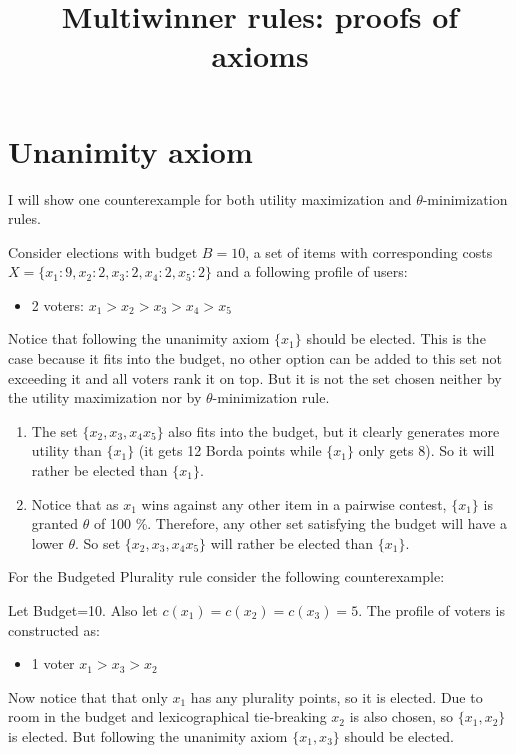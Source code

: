 \documentclass{article}
\title{Multiwinner rules: proofs of axioms}
\begin{document}
\maketitle

\section{Unanimity axiom}
I will show one counterexample for both utility maximization and $\theta$-minimization rules.

Consider elections with budget $B=10$, a set of items with corresponding costs $X= \{x_1:9, x_2:2, x_3:2, x_4:2, x_5:2\}$ and a following profile of users:
\begin{itemize}
\item 2 voters: $x_1 > x_2 >x_3 > x_4 > x_5$
\end{itemize}
 Notice that following the unanimity axiom $\{x_1 \}$ should be elected. This is the case because it fits into the budget, no other option can be added to this set not exceeding it and all voters rank it on top. But it is not the set chosen neither by the utility maximization nor by $\theta$-minimization rule.
 
\begin{enumerate}
\item The set $\{x_2, x_3, x_4 x_5 \}$ also fits into the budget, but it clearly generates more utility than $\{ x_1\}$ (it gets 12 Borda points while $\{ x_1\}$ only gets 8). So it will rather be elected than $\{x_1 \}$. 
\item Notice that as $x_1$ wins against any other item in a pairwise contest, $\{x_1 \}$ is granted $\theta$ of 100 \%. Therefore, any other set satisfying the budget will have a lower $\theta$. So set $\{x_2, x_3, x_4 x_5 \}$ will rather be elected than $\{x_1 \}$.
\end{enumerate}
For the Budgeted Plurality rule consider the following counterexample:

Let Budget=10. Also let $c(x_1)=c(x_2)=c(x_3)=5$. The profile of voters is constructed as:

\begin{itemize}
	\item 1 voter $x_1 > x_3 > x_2$
\end{itemize}
Now notice that that only $x_1$ has any plurality points, so it is elected. Due to room in the budget and lexicographical tie-breaking $x_2$ is also chosen, so $\{ x_1, x_2\}$ is elected. But following the unanimity axiom $\{x_1, x_3\}$ should be elected. 
\end{document}
